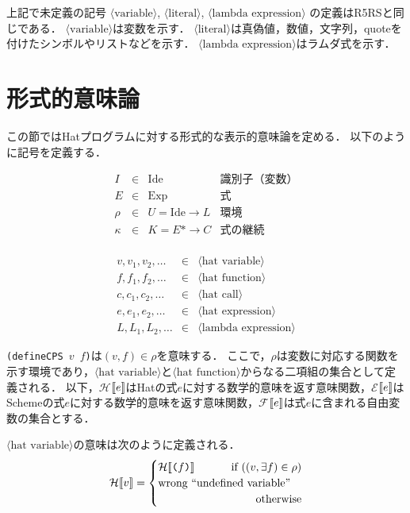 \documentclass[twocolumn]{jarticle}
\newcommand{\NT}[1]{\ensuremath{\langle\mbox{#1}\rangle}\allowbreak}
\newcommand{\dlrBrack}[1]{\ensuremath{[\![#1]\allowbreak\!]}}
\newcommand{\C}[1]{\mbox{\tt#1}}
\newcommand{\sS}[1]{\ensuremath{\mathcal{E}}\dlrBrack{\mbox{\tt#1}}}
\newcommand{\sH}[1]{\ensuremath{\mathcal{H}}\dlrBrack{\mbox{\tt#1}}}
\newcommand{\FV}[1]{\ensuremath{\mathcal{F}}\dlrBrack{\C{#1}}}
\begin{document}
上記で未定義の記号 \NT{variable}, \NT{literal}, \NT{lambda expression} の定義はR5RSと同じである．
\NT{variable}は変数を示す．
\NT{literal}は真偽値，数値，文字列，quoteを付けたシンボルやリストなどを示す．
\NT{lambda expression}はラムダ式を示す．

\section{形式的意味論}

この節ではHatプログラムに対する形式的な表示的意味論を定める．
以下のように記号を定義する．

\[\begin{array}{rcll}
I      &\in& \mbox{Ide}           & \mbox{識別子（変数）}\\
E      &\in& \mbox{Exp}           & \mbox{式} \\
\rho   &\in& U = \mbox{Ide} \to L & 環境  \\
\kappa &\in& K = E* \to C         & 式の継続 \\
\end{array}\]

\begin{eqnarray*}
v, v_1, v_2,\ldots &\in& \NT{hat variable} \\
f, f_1, f_2,\ldots &\in& \NT{hat function} \\
c, c_1, c_2,\ldots &\in& \NT{hat call} \\
e, e_1, e_2,\ldots &\in& \NT{hat expression} \\
L, L_1, L_2,\ldots &\in& \NT{lambda expression}
\end{eqnarray*}

\C{(defineCPS $v$ $f$)}は$(v, f)\in\rho$を意味する．
ここで，$\rho$は変数に対応する関数を示す環境であり，\NT{hat variable}と\NT{hat function}からなる二項組の集合として定義される．
以下，\sH{$e$}はHatの式$e$に対する数学的意味を返す意味関数，\sS{$e$}はSchemeの式$e$に対する数学的意味を返す意味関数，\FV{$e$}は式$e$に含まれる自由変数の集合とする．

\NT{hat variable}の意味は次のように定義される．
\begin{eqnarray}
  \sH{$v$}=
  \begin{cases}
  \sH{($f$)} & \llap{if $((v,\exists f)\in\rho)$} \\
  \mbox{wrong ``undefined variable''} \\
  & \llap{otherwise}
  \end{cases}
\end{eqnarray}
\end{document}

